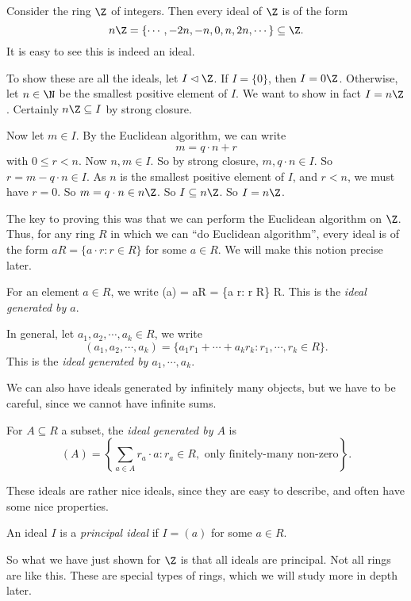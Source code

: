 \documentclass[a4paper]{article}
\begin{document}
\begin{eg}
  Consider the ring $\Z$ of integers. Then every ideal of $\Z$ is of the form
  \[
    n\Z = \{\cdots, -2n, -n, 0, n, 2n, \cdots\} \subseteq \Z.
  \]
  It is easy to see this is indeed an ideal.

  To show these are all the ideals, let $I \lhd \Z$. If $I = \{0\}$, then $I = 0\Z$. Otherwise, let $n \in \N$ be the smallest positive element of $I$. We want to show in fact $I = n\Z$. Certainly $n\Z \subseteq I$ by strong closure.

  Now let $m \in I$. By the Euclidean algorithm, we can write
  \[
    m = q \cdot n + r
  \]
  with $0 \leq r < n$. Now $n,m \in I$. So by strong closure, $m, q \cdot n \in I$. So $r = m - q\cdot n \in I$. As $n$ is the smallest positive element of $I$, and $r < n$, we must have $r = 0$. So $m = q\cdot n \in n\Z$. So $I \subseteq n\Z$. So $I = n\Z$.
\end{eg}
The key to proving this was that we can perform the Euclidean algorithm on $\Z$. Thus, for any ring $R$ in which we can ``do Euclidean algorithm'', every ideal is of the form $aR = \{a \cdot r: r \in R\}$ for some $a \in R$. We will make this notion precise later.

\begin{defi}
  For an element $a \in R$, we write
    (a) = aR = \{a \cdot r: r \in R\} \lhd R.
  \]
  This is the \emph{ideal generated by $a$}.

  In general, let $a_1, a_2, \cdots, a_k \in R$, we write
  \[
    (a_1, a_2, \cdots, a_k) = \{ a_1 r_1 + \cdots + a_k r_k : r_1, \cdots, r_k \in R\}.
  \]
  This is the \emph{ideal generated by $a_1, \cdots, a_k$}.
\end{defi}
We can also have ideals generated by infinitely many objects, but we have to be careful, since we cannot have infinite sums.
\begin{defi}
  For $A \subseteq R$ a subset, the \emph{ideal generated by $A$} is
  \[
    (A) = \left\{\sum_{a \in A} r_a \cdot a: r_a \in R, \text{ only finitely-many non-zero}\right\}.
  \]
\end{defi}

These ideals are rather nice ideals, since they are easy to describe, and often have some nice properties.
\begin{defi}
  An ideal $I$ is a \emph{principal ideal} if $I = (a)$ for some $a \in R$.
\end{defi}
So what we have just shown for $\Z$ is that all ideals are principal. Not all rings are like this. These are special types of rings, which we will study more in depth later.
\end{document}
